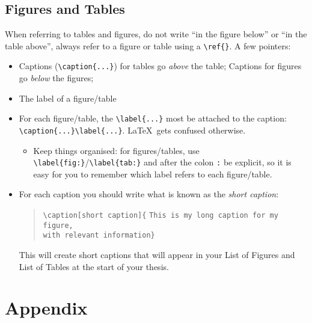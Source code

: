 \documentclass[a4paper,11pt,masters,en,listoffigures,listoftables]{NMBU}
\newcommand{\cl}[1]{\textcolor{nmbugreen}{#1}}
\begin{document}
\subsection*{Figures and Tables}
When referring to tables and figures, do not write ``in the figure below'' or ``in the table above'', always refer to a figure or table using a \verb|\ref{}|. A few pointers:
\begin{itemize}
    \item Captions (\verb|\caption{...}|) for tables go \textit{above} the table; Captions for figures go \textit{below} the figures;
    \item The label of a figure/table 
    \item For each figure/table, the \verb|\label{...}| most be attached to the caption: \\ \verb|\caption{...}\label{...}|. \LaTeX~gets confused otherwise.
    \begin{itemize}
        \item Keep things organised: for figures/tables, use \verb|\label{fig:}|/\verb|\label{tab:}| and after the colon \verb|:| be explicit, so it is easy for you to remember which label refers to each figure/table.
    \end{itemize}
    \item For each caption you should write what is known as the \textit{short caption}:
    \begin{quote}
        \verb|\caption[|\cl{\texttt{short caption}}\verb|]{| \texttt{This is my long caption for my figure,}\\
        \verb|with relevant information}|
    \end{quote}
    This will create short captions that will appear in your List of Figures and List of Tables at the start of your thesis.
\end{itemize}



\clearpage
{} %

\clearpage
\appendices %

\section{Appendix}
\end{document}
